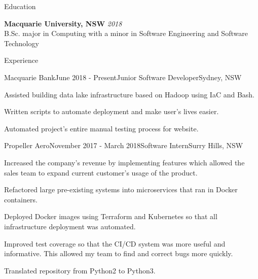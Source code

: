 \documentclass{resume} %
\begin{document}

\begin{rSection}{Education}

{\bf Macquarie University, NSW} \hfill {\em 2018} \\ 
B.Sc. major in Computing with a minor in Software Engineering and Software Technology\\

\end{rSection}


\begin{rSection}{Experience}


\begin{rSubsection}{Macquarie Bank}{June 2018 - Present}{Junior Software Developer}{Sydney, NSW}
\item Assisted building data lake infrastructure based on Hadoop using IaC and Bash.
\item Written scripts to automate deployment and make user's lives easier.
\item Automated project's entire manual testing process for website. 
\end{rSubsection}

\begin{rSubsection}{Propeller Aero}{November 2017 - March 2018}{Software Intern}{Surry Hills, NSW}
\item Increased the company's revenue by implementing features which allowed the sales team to expand current customer's usage of the product.
\item Refactored large pre-existing systems into microservices that ran in Docker containers. 
\item Deployed Docker images using Terraform and Kubernetes so that all infrastructure deployment was automated.
\item Improved test coverage so that the CI/CD system was more useful and informative. This allowed my team to find and correct bugs more quickly.
\item Translated repository from Python2 to Python3.
\end{rSubsection}

\end{rSection}
\end{document}
